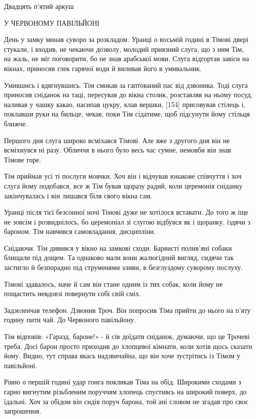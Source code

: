 Двадцять п'ятий аркуш

У ЧЕРВОНОМУ ПАВІЛЬЙОНІ

День у замку минав суворо за розкладом. Уранці о восьмій годині в Тімові двері стукали, і входив, не чекаючи дозволу, молодий приязний слуга, що з ним Тім, на жаль, не міг поговорити, бо не знав арабської мови. Слуга відгортав завіси на вікнах, приносив глек гарячої води й виливав його в умивальник.

Умившись і вдягнувшись. Тім смикав за гаптований пас від дзвоника. Тоді слуга приносив сніданок на таці, пересував до вікна столик, розставляв на ньому посуд, наливав у чашку какао, насипав цукру, клав вершки, [154] присовував стілець і, поклавши руки на бильце, чекав, поки Тім сідатиме, щоб підсунути йому стільця ближче.

Першого дня слуга широко всміхався Тімові. Але вже з другого дня він не всміхнувся ні разу. Обличчя в нього було весь час сумне, немовби він знав Тімове горе.

Тім приймав усі ті послуги мовчки. Хоч він і відчував юнакове співчуття і хоч слуга йому подобався, все ж Тім бував щоразу радий, коли церемонія сніданку закінчувалась і він лишався біля свого вікна сам.

Уранці після тієї безсонної ночі Тімові дуже не хотілося вставати. До того ж іще не зовсім і розвиднілось, бо церемоніал зі слугою відбувся як і щоранку, їздячи з бароном. Тім навчився самовладання, дисципліни.

Снідаючи. Тім дивився у вікно на замкові сходи. Барвисті полив'яні собаки блищали під дощем. Та однаково мали вони жалюгідний вигляд, сидячи так застигло й безпорадно під струменями зливи, в безглуздому суворому послуху.

Тімові здавалось, наче й сам він стане одним із тих собак, коли йому не пощастить невдовзі повернути собі свій сміх.

Задзеленчав телефон. Дзвонив Троч. Він попросив Тіма прийти до нього на п'яту годину пити чай. До Червоного павільйону.

Тім відповів: «Гаразд, бароне!» - й сів доїдати сніданок, думаючи, що це Трочеві треба. Досі барон просто приходив до хлопцевої кімнати, коли хотів щось сказати йому. Видно, тут справа якась надзвичайна, що він хоче зустрітись із Тімом у павільйоні.

Рівно о першій годині удар гонга покликав Тіма на обід. Широкими сходами з гарно вигнутим різьбленим поруччям хлопець спустивсь на широкий поверх, до їдальні. Хоч за обідом він сидів поруч барона, той ані словом не згадав про своє запрошення.

